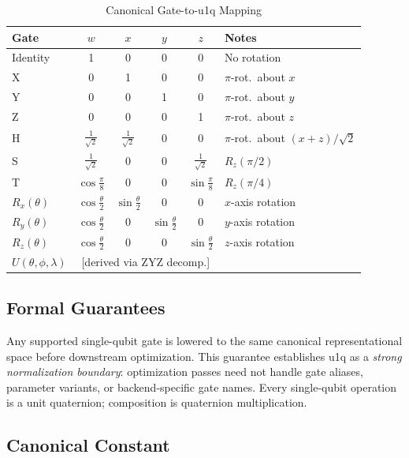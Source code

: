 \documentclass[conference]{IEEEtran}
\begin{document}
\begin{table}[htbp]
\caption{Canonical Gate-to-u1q Mapping}
\begin{center}
\begin{tabular}{lccccl}
\toprule
\textbf{Gate} & $w$ & $x$ & $y$ & $z$ & \textbf{Notes} \\
\midrule
Identity  & 1 & 0 & 0 & 0 & No rotation \\
X         & 0 & 1 & 0 & 0 & $\pi$-rot.\ about $x$ \\
Y         & 0 & 0 & 1 & 0 & $\pi$-rot.\ about $y$ \\
Z         & 0 & 0 & 0 & 1 & $\pi$-rot.\ about $z$ \\
H         & $\tfrac{1}{\sqrt{2}}$ & $\tfrac{1}{\sqrt{2}}$ & 0 & 0 & $\pi$-rot.\ about $(x{+}z)/\sqrt{2}$ \\
S         & $\tfrac{1}{\sqrt{2}}$ & 0 & 0 & $\tfrac{1}{\sqrt{2}}$ & $R_z(\pi/2)$ \\
T         & $\cos\tfrac{\pi}{8}$ & 0 & 0 & $\sin\tfrac{\pi}{8}$ & $R_z(\pi/4)$ \\
$R_x(\theta)$ & $\cos\tfrac{\theta}{2}$ & $\sin\tfrac{\theta}{2}$ & 0 & 0 & $x$-axis rotation \\
$R_y(\theta)$ & $\cos\tfrac{\theta}{2}$ & 0 & $\sin\tfrac{\theta}{2}$ & 0 & $y$-axis rotation \\
$R_z(\theta)$ & $\cos\tfrac{\theta}{2}$ & 0 & 0 & $\sin\tfrac{\theta}{2}$ & $z$-axis rotation \\
$U(\theta,\phi,\lambda)$ & \multicolumn{4}{c}{[derived via ZYZ decomp.]} & \\
\bottomrule
\end{tabular}
\label{tab:gatemapping}
\end{center}
\end{table}

\subsection{Formal Guarantees}

Any supported single-qubit gate is lowered to the same canonical representational space before
downstream optimization. This guarantee establishes u1q as a \textit{strong normalization
boundary}: optimization passes need not handle gate aliases, parameter variants, or
backend-specific gate names. Every single-qubit operation is a unit quaternion; composition is
quaternion multiplication.

\subsection{Canonical Constant}
\end{document}
